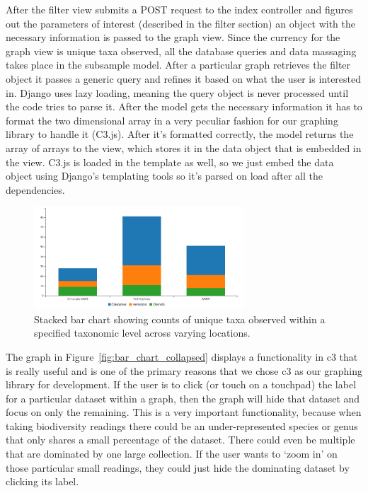 \documentclass[10pt,draftclsnofoot,onecolumn]{IEEEtran}
\begin{document}
After the filter view submits a POST request to the index controller and figures out the parameters of interest (described in the filter section) an object with the necessary information is passed to the graph view.
Since the currency for the graph view is unique taxa observed, all the database queries and data massaging takes place in the subsample model.
After a particular graph retrieves the filter object it passes a generic query and refines it based on what the user is interested in.
Django uses lazy loading, meaning the query object is never processed until the code tries to parse it.
After the model gets the necessary information it has to format the two dimensional array in a very peculiar fashion for our graphing library to handle it (C3.js).
After it's formatted correctly, the model returns the array of arrays to the view, which stores it in the data object that is embedded in the view.
C3.js is loaded in the template as well, so we just embed the data object using Django's templating tools so it's parsed on load after all the dependencies.

\begin{figure}[h]
\centering
\includegraphics[width=0.70\textwidth]{images/bar_chart.png}
\captionsetup{justification=centering}
\caption{
  Stacked bar chart showing counts of unique taxa observed within a specified taxonomic level across varying locations.
}
\label{fig:bar_chart}
\end{figure}

The graph in Figure~\ref{fig:bar_chart_collapsed} displays a functionality in c3 that is really useful and is one of the primary reasons that we chose c3 as our graphing library for development.
If the user is to click (or touch on a touchpad) the label for a particular dataset within a graph, then the graph will hide that dataset and focus on only the remaining.
This is a very important functionality, because when taking biodiversity readings there could be an under-represented species or genus that only shares a small percentage of the dataset.
There could even be multiple that are dominated by one large collection.
If the user wants to ‘zoom in’ on those particular small readings, they could just hide the dominating dataset by clicking its label.
\end{document}
